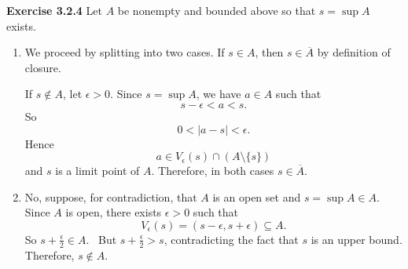 \documentclass[12pt]{article}
\begin{document}
\textbf{Exercise 3.2.4}
Let \( A \) be nonempty and bounded above so that \( s = \sup A \) exists.
\begin{enumerate}[label=(\alph*)]
    \item We proceed by splitting into two cases.
          If \( s \in A \), then \( s \in \overline{A}  \) by definition of closure.

          If \( s \not \in A \), let \( \epsilon > 0 \).
          Since \( s = \sup A \), we have \( a \in A \) such that
          \[
              s - \epsilon < a < s.
          \]
          So
          \[
              0 < \vert a - s \vert < \epsilon.
          \]
          Hence
          \[
              a \in V_{\epsilon}(s) \cap (A \setminus \{s\})
          \]
          and \( s  \) is a limit point of \( A \).
          Therefore, in both cases \( s \in \overline{A} \).

    \item No, suppose, for contradiction, that \( A \) is an open set and \( s = \sup A \in A \).
          Since \( A  \) is open, there exists \( \epsilon > 0 \) such that
          \[
              V_{\epsilon}(s) = ( s - \epsilon, s + \epsilon) \subseteq A.
          \]
          So \( s + \frac{\epsilon}{2} \in A \). \
          But \( s + \frac{\epsilon}{2} > s \), contradicting the fact that \( s \) is an upper bound.
          Therefore, \( s \not \in A \).


\end{enumerate}
\end{document}
